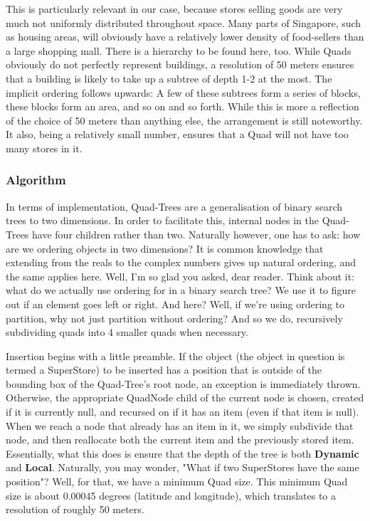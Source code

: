 \documentclass[12pt]{article}
\begin{document}
{This is particularly relevant in our case, because stores selling goods are very much not uniformly distributed throughout space. Many parts of Singapore, such as housing areas, will obviously have a relatively lower density of food-sellers than a large shopping mall. There is a hierarchy to be found here, too. While Quads obviously do not perfectly represent buildings, a resolution of 50 meters ensures that a building is likely to take up a subtree of depth 1-2 at the most. The implicit ordering follows upwards: A few of these subtrees form a series of blocks, these blocks form an area, and so on and so forth. While this is more a reflection of the choice of 50 meters than anything else, the arrangement is still noteworthy. It also, being a relatively small number, ensures that a Quad will not have too many stores in it.

\subsubsection{Algorithm}

In terms of implementation, Quad-Trees are a generalisation of binary search trees to two dimensions. In order to facilitate this, internal nodes in the Quad-Trees have four children rather than two. Naturally however, one has to ask: how are we ordering objects in two dimensions? It is common knowledge that extending from the reals to the complex numbers gives up natural ordering, and the same applies here. Well, I'm so glad you asked, dear reader. Think about it: what do we actually use ordering for in a binary search tree? We use it to figure out if an element goes left or right. And here? Well, if we're using ordering to partition, why not just partition without ordering? And so we do, recursively subdividing quads into 4 smaller quads when necessary.

Insertion begins with a little preamble. If the object (the object in question is termed a SuperStore) to be inserted has a position that is outside of the bounding box of the Quad-Tree's root node, an exception is immediately thrown. Otherwise, the appropriate QuadNode child of the current node is chosen, created if it is currently null, and recursed on if it has an item (even if that item is null). When we reach a node that already has an item in it, we simply subdivide that node, and then reallocate both the current item and the previously stored item. Essentially, what this does is ensure that the depth of the tree is both \textbf{Dynamic} and \textbf{Local}. Naturally, you may wonder, "What if two SuperStores have the same position"? Well, for that, we have a minimum Quad size. This minimum Quad size is about 0.00045 degrees (latitude and longitude), which translates to a resolution of roughly 50 meters.

}
\end{document}
